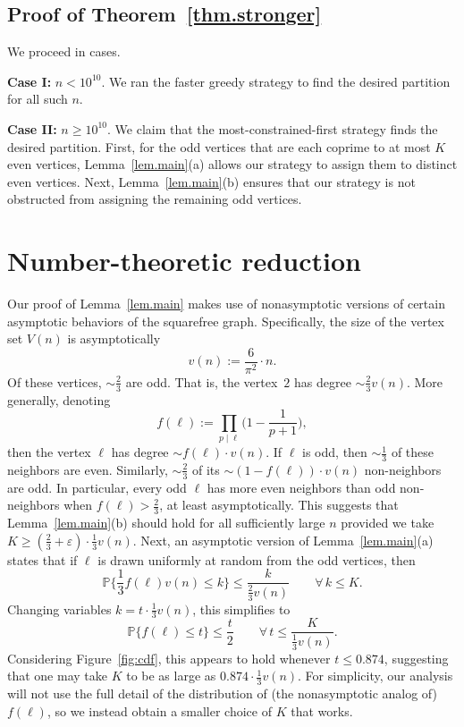 \documentclass{article}
\theoremstyle{plain}
\theoremstyle{definition}
\theoremstyle{remark}
\begin{document}
\subsection{Proof of Theorem~\ref{thm.stronger}}

We proceed in cases.

\medskip

\noindent
\textbf{Case I:} $n<10^{10}$.
We ran the faster greedy strategy to find the desired partition for all such $n$.

\medskip

\noindent
\textbf{Case II:} $n\geq10^{10}$.
We claim that the most-constrained-first strategy finds the desired partition.
First, for the odd vertices that are each coprime to at most $K$ even vertices, Lemma~\ref{lem.main}(a) allows our strategy to assign them to distinct even vertices.
Next, Lemma~\ref{lem.main}(b) ensures that our strategy is not obstructed from assigning the remaining odd vertices.


\section{Number-theoretic reduction}
\label{sec.number theoretic}

Our proof of Lemma~\ref{lem.main} makes use of nonasymptotic versions of certain asymptotic behaviors of the squarefree graph.
Specifically, the size of the vertex set $V(n)$ is asymptotically
\[
v(n):=\frac{6}{\pi^2}\cdot n.
\]
Of these vertices, $\sim\frac{2}{3}$ are odd.
That is, the vertex~$2$ has degree $\sim\frac{2}{3}v(n)$.
More generally, denoting
\[
f(\ell)
:=\prod_{p\mid\ell}\bigg(1-\frac{1}{p+1}\bigg),
\]
then the vertex $\ell$ has degree $\sim f(\ell)\cdot v(n)$.
If $\ell$ is odd, then $\sim\frac{1}{3}$ of these neighbors are even.
Similarly, $\sim\frac{2}{3}$ of its $\sim(1-f(\ell))\cdot v(n)$ non-neighbors are odd.
In particular, every odd $\ell$ has more even neighbors than odd non-neighbors when $f(\ell)>\frac{2}{3}$, at least asymptotically.
This suggests that Lemma~\ref{lem.main}(b) should hold for all sufficiently large $n$ provided we take $K\geq(\frac{2}{3}+\varepsilon) \cdot\frac{1}{3}v(n)$.
Next, an asymptotic version of Lemma~\ref{lem.main}(a) states that if $\ell$ is drawn uniformly at random from the odd vertices, then 
\[
\mathbb{P}\bigg\{\frac{1}{3}f(\ell)v(n)\leq k\bigg\}
\leq\frac{k}{\frac{2}{3}v(n)}
\qquad
\forall\,k\leq K.
\]
Changing variables $k=t\cdot \frac{1}{3}v(n)$, this simplifies to
\begin{equation}
\label{eq.tail bound}
\mathbb{P}\{f(\ell)\leq t\}
\leq\frac{t}{2}
\qquad
\forall\,t\leq\frac{K}{\frac{1}{3}v(n)}.
\end{equation}
Considering Figure~\ref{fig:cdf}, this appears to hold whenever $t\leq0.874$, suggesting that one may take $K$ to be as large as $0.874\cdot \frac{1}{3}v(n)$.
For simplicity, our analysis will not use the full detail of the distribution of (the nonasymptotic analog of) $f(\ell)$, so we instead obtain a smaller choice of $K$ that works.
\end{document}
